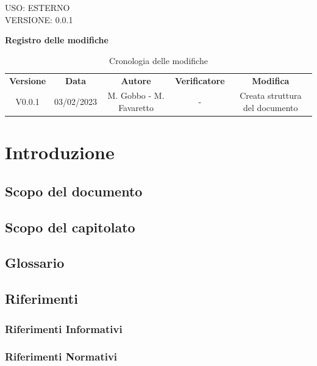 \documentclass[5pt]{article}
\begin{document}
\begin{flushright}
    \begin{spacing}{1}
        USO: ESTERNO\\
        VERSIONE: 0.0.1\\
    \end{spacing}
\end{flushright}


\restoregeometry

\pagebreak

\textbf{\Large Registro delle modifiche}
\begin{table}[ht]
\centering
\begin{tabular}{|c|c|c|c|c|}
\hline
\textbf{Versione} & \textbf{Data} & \textbf{Autore} & \textbf{Verificatore} & \textbf{Modifica} \\
V0.0.1 & 03/02/2023 & M. Gobbo - M. Favaretto & - & Creata struttura del documento \\
\hline
\end{tabular}
\caption{Cronologia delle modifiche}
\label{tab:conference}
\end{table}

\pagebreak
\tableofcontents
\pagebreak

\section{Introduzione}
\subsection{Scopo del documento}
\subsection{Scopo del capitolato}
\subsection{Glossario}
\subsection{Riferimenti}
\subsubsection{Riferimenti Informativi}
\subsubsection{Riferimenti Normativi}
\end{document}
